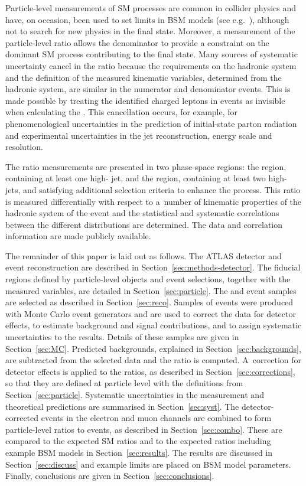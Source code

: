 \documentclass[cernpreprint,txfonts,UKenglish,texlive=2016]{\ATLASLATEXPATH atlasdoc}
\begin{document}
Particle-level measurements of SM processes are common in collider
physics and have, on occasion, been used to set limits in BSM
models (see e.g.~\cite{STDM-2012-03}), although not to search for new physics in the \ptmissjet{} final state. 
Moreover, a measurement of the particle-level ratio allows the denominator to provide a constraint on
the dominant SM process contributing to the \ptmissjet{} final state.  
Many sources of systematic uncertainty cancel in the ratio because the
requirements on the hadronic system and the definition of  the measured kinematic
variables, determined from the hadronic system, are similar in the
numerator \ptmissjet{} and denominator \lljet{} events. 
This is made possible by treating the identified charged leptons in
\lljet{} events as invisible when calculating the \ptmiss{}.
This cancellation occurs, for example, for phenomenological
uncertainties in the prediction of initial-state parton radiation and
 experimental uncertainties in the jet reconstruction, energy scale and resolution.

The ratio measurements are presented in two phase-space regions: the
\onejet{} region, containing  at least one high-\pt{} jet, and the \vbf{}
region, containing at least two  high-\pt{} jets, and satisfying additional
selection criteria to enhance the \vbf{} process.
This ratio is measured differentially with respect to a~number of kinematic properties of the hadronic system of the event 
and the statistical and systematic correlations between the different distributions are determined. 
The data and correlation information are made publicly available.

The remainder of this paper is laid out as follows.
The ATLAS detector and event reconstruction are described in
Section~\ref{sec:methods-detector}.
The fiducial regions defined by particle-level objects and event
selections, together with the measured variables,
are detailed in Section~\ref{sec:particle}. The \ptmissjet{} and
\lljet{} event samples are
selected as described in Section~\ref{sec:reco}. 
Samples of events were produced with Monte Carlo event generators and are used to correct the data for detector
effects, to estimate background and signal contributions, and to assign
systematic uncertainties to the results. Details of these samples are given in Section~\ref{sec:MC}.
Predicted
backgrounds, explained in Section~\ref{sec:backgrounds}, are
subtracted from the selected data and the ratio is computed. A~correction for
detector effects is applied to the ratios, as described in
Section~\ref{sec:corrections}, so that they are defined at 
particle level with the definitions from Section~\ref{sec:particle}.
Systematic
uncertainties in the measurement and theoretical predictions are
summarised in Section~\ref{sec:syst}. The detector-corrected events 
in the electron and muon channels are
combined to form particle-level ratios to \lljet{} events, as
described in Section~\ref{sec:combo}. These are
compared to the expected SM ratios and to the expected ratios including
example BSM models in Section~\ref{sec:results}. 
The results are discussed in Section~\ref{sec:discuss} and example limits are placed on BSM model parameters.
Finally, conclusions are given in Section~\ref{sec:conclusions}.
\end{document}
